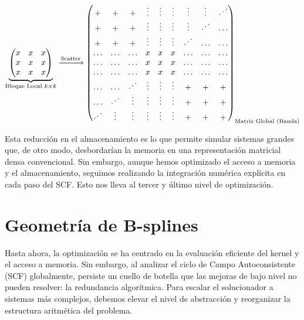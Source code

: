 \documentclass[12pt, a4paper, oneside, spanish]{article}
\begin{document}
\begin{equation}
\label{eq:matrix_scattering}
\underbrace{
\begin{pmatrix}
x & x & x \\
x & x & x \\
x & x & x
\end{pmatrix}
}_{\text{Bloque Local } k \times k}
\xrightarrow{\text{Scatter}}
\begin{pmatrix}
\mathbf{+} & \mathbf{+} & \mathbf{+} & \vdots & \vdots & \vdots & \vdots & \vdots & \reflectbox{$\ddots$} \\
\mathbf{+} & \mathbf{+} & \mathbf{+} & \vdots & \vdots & \vdots & \vdots & \reflectbox{$\ddots$} & \dots \\
\mathbf{+} & \mathbf{+} & \mathbf{+} & \vdots & \vdots & \vdots & \reflectbox{$\ddots$} & \dots & \dots \\
\dots & \dots & \dots & x & x & x & \dots & \dots & \dots \\
\dots & \dots & \dots & x & x & x & \dots & \dots & \dots \\
\dots & \dots & \dots & x & x & x & \dots & \dots & \dots \\
\dots & \dots & \reflectbox{$\ddots$} & \vdots & \vdots & \vdots & \mathbf{+} & \mathbf{+} & \mathbf{+}\\
\dots & \reflectbox{$\ddots$} & \vdots & \vdots & \vdots & \vdots & \mathbf{+} & \mathbf{+} & \mathbf{+}\\
\reflectbox{$\ddots$} & \vdots & \vdots & \vdots & \vdots & \vdots & \mathbf{+} & \mathbf{+} & \mathbf{+}\\
\end{pmatrix}
_{\text{Matriz Global (Banda)}}
\end{equation}

Esta reducción en el almacenamiento es lo que permite simular sistemas grandes que, de otro modo, desbordarían la memoria en una representación matricial densa convencional. Sin embargo, aunque hemos optimizado el acceso a memoria y el almacenamiento, seguimos realizando la integración numérica explícita en cada paso del SCF. Esto nos lleva al tercer y último nivel de optimización.

\section{Geometría de B-splines}

Hasta ahora, la optimización se ha centrado en la evaluación eficiente del kernel y el acceso a memoria. Sin embargo, al analizar el ciclo de Campo Autoconsistente (SCF) globalmente, persiste un cuello de botella que las mejoras de bajo nivel no pueden resolver: la redundancia algorítmica. Para escalar el solucionador a sistemas más complejos, debemos elevar el nivel de abstracción y reorganizar la estructura aritmética del problema.
\end{document}
